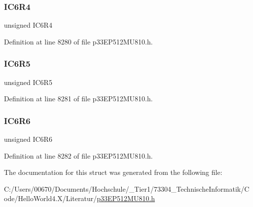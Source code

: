 \subsubsection{\texorpdfstring{I\+C6\+R4}{IC6R4}}
{\footnotesize\ttfamily unsigned I\+C6\+R4}



Definition at line 8280 of file p33\+E\+P512\+M\+U810.\+h.

\mbox{\label{structtag_r_p_i_n_r9_b_i_t_s_a60dde539eab1ca4fdb76931b0ee332cf}} 
\subsubsection{\texorpdfstring{I\+C6\+R5}{IC6R5}}
{\footnotesize\ttfamily unsigned I\+C6\+R5}



Definition at line 8281 of file p33\+E\+P512\+M\+U810.\+h.

\mbox{\label{structtag_r_p_i_n_r9_b_i_t_s_ab8cb15e74fe176a52b05d4e160092fec}} 
\subsubsection{\texorpdfstring{I\+C6\+R6}{IC6R6}}
{\footnotesize\ttfamily unsigned I\+C6\+R6}



Definition at line 8282 of file p33\+E\+P512\+M\+U810.\+h.



The documentation for this struct was generated from the following file\+:\begin{DoxyCompactItemize}
\item 
C\+:/\+Users/00670/\+Documents/\+Hochschule/\+\_\+\+Tier1/73304\+\_\+\+Technische\+Informatik/\+Code/\+Hello\+World4.\+X/\+Literatur/\hyperlink{p33_e_p512_m_u810_8h}{p33\+E\+P512\+M\+U810.\+h}\end{DoxyCompactItemize}
